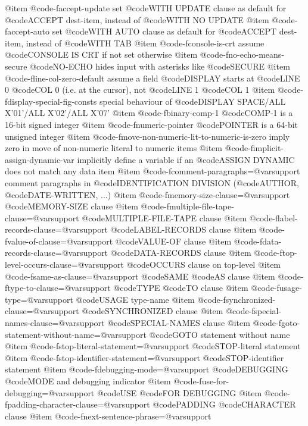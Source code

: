 @item @code{-faccept-update}
set @code{WITH UPDATE} clause as default for @code{ACCEPT} dest-item, instead of @code{WITH NO UPDATE}
@item @code{-faccept-auto}
set @code{WITH AUTO} clause as default for @code{ACCEPT} dest-item, instead of @code{WITH TAB}
@item @code{-fconsole-is-crt}
assume @code{CONSOLE IS CRT} if not set otherwise
@item @code{-fno-echo-means-secure}
@code{NO-ECHO} hides input with asterisks like @code{SECURE}
@item @code{-fline-col-zero-default}
assume a field @code{DISPLAY} starts at @code{LINE} 0 @code{COL} 0 (i.e. at the cursor), not @code{LINE} 1 @code{COL} 1
@item @code{-fdisplay-special-fig-consts}
special behaviour of @code{DISPLAY SPACE}/ALL X'01'/ALL X'02'/ALL X'07'
@item @code{-fbinary-comp-1}
@code{COMP}-1 is a 16-bit signed integer
@item @code{-fnumeric-pointer}
@code{POINTER} is a 64-bit unsigned integer
@item @code{-fmove-non-numeric-lit-to-numeric-is-zero}
imply zero in move of non-numeric literal to numeric items
@item @code{-fimplicit-assign-dynamic-var}
implicitly define a variable if an @code{ASSIGN DYNAMIC} does not match any data item
@item @code{-fcomment-paragraphs=@var{support}}
comment paragraphs in @code{IDENTIFICATION DIVISION} (@code{AUTHOR}, @code{DATE-WRITTEN}, ...)
@item @code{-fmemory-size-clause=@var{support}}
@code{MEMORY-SIZE} clause
@item @code{-fmultiple-file-tape-clause=@var{support}}
@code{MULTIPLE-FILE-TAPE} clause
@item @code{-flabel-records-clause=@var{support}}
@code{LABEL-RECORDS} clause
@item @code{-fvalue-of-clause=@var{support}}
@code{VALUE-OF} clause
@item @code{-fdata-records-clause=@var{support}}
@code{DATA-RECORDS} clause
@item @code{-ftop-level-occurs-clause=@var{support}}
@code{OCCURS} clause on top-level
@item @code{-fsame-as-clause=@var{support}}
@code{SAME} @code{AS} clause
@item @code{-ftype-to-clause=@var{support}}
@code{TYPE} @code{TO} clause
@item @code{-fusage-type=@var{support}}
@code{USAGE} type-name
@item @code{-fsynchronized-clause=@var{support}}
@code{SYNCHRONIZED} clause
@item @code{-fspecial-names-clause=@var{support}}
@code{SPECIAL-NAMES} clause
@item @code{-fgoto-statement-without-name=@var{support}}
@code{GOTO} statement without name
@item @code{-fstop-literal-statement=@var{support}}
@code{STOP}-literal statement
@item @code{-fstop-identifier-statement=@var{support}}
@code{STOP}-identifier statement
@item @code{-fdebugging-mode=@var{support}}
@code{DEBUGGING} @code{MODE} and debugging indicator
@item @code{-fuse-for-debugging=@var{support}}
@code{USE} @code{FOR DEBUGGING}
@item @code{-fpadding-character-clause=@var{support}}
@code{PADDING} @code{CHARACTER} clause
@item @code{-fnext-sentence-phrase=@var{support}}
